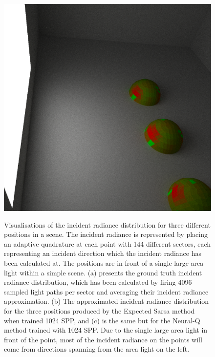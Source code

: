 \documentclass[../dissertation.tex]{subfiles}
\begin{document}
\begin{figure}[h]
  \label{fig:exp_sarsa_distribution}
\endminipage\hspace{1em}
  \includegraphics[width=\textwidth]{images/renders/neural_q_visualisation.png}
  \label{fig:neural_q_distribution}
\endminipage
\caption{Visualisations of the incident radiance distribution for three different positions in a scene. The incident radiance is represented by placing an adaptive quadrature at each point with 144 different sectors, each representing an incident direction which the incident radiance has been calculated at. The positions are in front of a single large area light within a simple scene. (a) presents the ground truth incident radiance distribution, which has been calculated by firing 4096 sampled light paths per sector and averaging their incident radiance approximation. (b) The approximated incident radiance distribution for the three positions produced by the Expected Sarsa method when trained 1024 SPP, and (c) is the same but for the Neural-Q method trained with 1024 SPP. Due to the single large area light in front of the point, most of the incident radiance on the points will come from directions spanning from the area light on the left.}
\label{fig:distribution_visualisation}
\end{figure}
\end{document}
